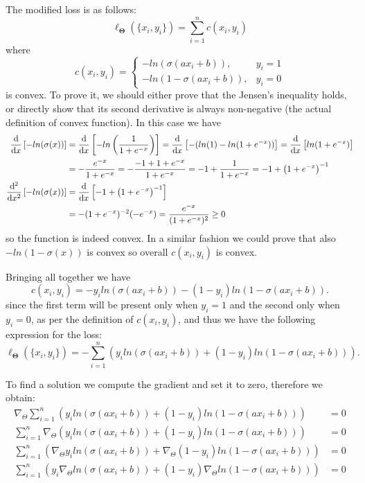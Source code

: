 The modified loss is as follows:
\begin{equation}
	\ell_\mathbf{\Theta}(\{x_i, y_i\}) = \sum_{i=1}^{n}c(x_i, y_i)
\end{equation}
where
\begin{equation}
	c(x_i, y_i) = \begin{cases}
               		-ln(\sigma(ax_i+b)),        & y_i = 1\\
               		-ln(1 - \sigma(ax_i+b)),    & y_i = 0
            	  \end{cases}
\end{equation}
is convex. To prove it, we should either prove that the Jensen's inequality holds, or directly show that its second derivative is always non-negative (the actual definition of convex function). In this case we have
\begin{align}
    \dv{x} \left[-ln(\sigma(x))\right] & = \dv{x} \left[-ln\left(\frac{1}{1 + e^{-x}}\right) \right] = \dv{x} \left[ -(ln(1) - ln(1+e^{-x})) \right] = \dv{x} \left[ ln(1+e^{-x}) \right] \\
    & = -\frac{e^{-x}}{1 + e^{-x}} = -\frac{-1 + 1 + e^{-x}}{1 + e^{-x}} = -1 + \frac{1}{1 + e^{-x}} = -1 + \left( 1 + e^{-x} \right)^{-1} \\
    \dv[2]{x} \left[ -ln(\sigma(x)) \right] & = \dv{x} \left[ -1 + \left( 1 + e^{-x} \right)^{-1} \right] \\ 
    & = -( 1 + e^{-x})^{-2} (-e^{-x}) = \frac{e^{-x}}{(1 + e^{-x})^2} \geq 0
\end{align}
so the function is indeed convex. In a similar fashion we could prove that also $-ln(1 - \sigma(x))$ is convex so overall $c(x_i, y_i)$ is convex.

Bringing all together we have 
\begin{equation}
	c(x_i, y_i) = -y_i ln(\sigma(ax_i+b)) - (1 - y_i)ln(1 - \sigma(ax_i+b)).
\end{equation}
since the first term will be present only when $y_i = 1$ and the second only when $y_i = 0$, as per the definition of $c(x_i, y_i)$, and thus we have the following expression for the loss:
\begin{equation}
	\ell_\mathbf{\Theta}(\{x_i, y_i\}) = - \sum_{i=1}^{n} \left( y_iln(\sigma(ax_i+b)) + (1 - y_i)ln(1 - \sigma(ax_i+b)) \right).
\end{equation}

To find a solution we compute the gradient and set it to zero, therefore we obtain:
\begin{align}
	\nabla_\Theta \sum_{i=1}^{n} \left( y_iln(\sigma(ax_i+b)) + (1 - y_i)ln(1 - \sigma(ax_i+b)) \right) &= 0 \\
	\sum_{i=1}^{n} \nabla_\Theta \left( y_iln(\sigma(ax_i+b)) + (1 - y_i)ln(1 - \sigma(ax_i+b)) \right) &= 0 \\
	\sum_{i=1}^{n} \left( \nabla_\Theta y_iln(\sigma(ax_i+b)) + \nabla_\Theta (1 - y_i) ln(1 - \sigma(ax_i+b)) \right) &= 0 \\
	\sum_{i=1}^{n} \left( y_i \nabla_\Theta ln(\sigma(ax_i+b)) + (1 - y_i) \nabla_\Theta ln(1 - \sigma(ax_i+b)) \right) &= 0 
\end{align}

